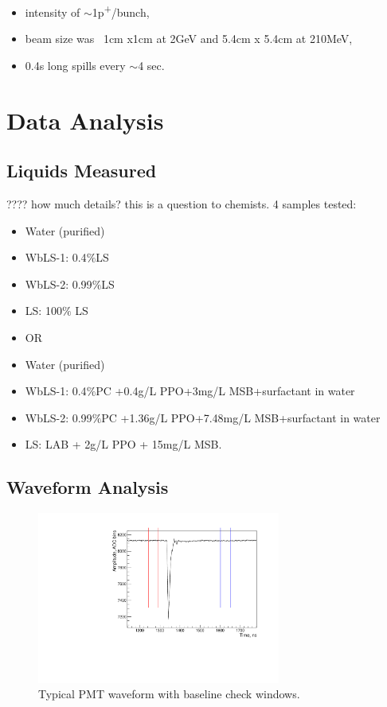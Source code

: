 \documentclass[preprint,12pt]{elsarticle}
\begin{document}
\begin{itemize}
	\item intensity of $\sim$1p\textsuperscript{+}/bunch,
	\item beam size was ~1cm x1cm at 2GeV and 5.4cm x 5.4cm at 210MeV,
	\item 0.4s long spills every $\sim$4 sec.
\end{itemize}

 \section{Data Analysis}
 \label{dataanalysissectiontop}


\subsection{Liquids Measured}
\label{liquidsmeasuredsection}
???? how much details? this is a question to chemists.
4 samples tested:
\begin{itemize}

 \item{Water (purified)}
 \item{WbLS-1: 0.4$\%$LS}
 \item{WbLS-2: 0.99$\%$LS}
 \item{LS: 100$\%$ LS}
\item{OR}

\item{Water (purified)}
 \item{WbLS-1: 0.4$\%$PC +0.4g/L PPO+3mg/L MSB+surfactant in water}
 \item{WbLS-2: 0.99$\%$PC +1.36g/L PPO+7.48mg/L MSB+surfactant in water}
 \item{LS: LAB + 2g/L PPO + 15mg/L MSB.}
\end{itemize}


\subsection{Waveform Analysis}
\label{waveformanalysis}


\begin{figure}[ht]
\centering
\includegraphics[width=80mm]{PMTtypicalSignal.pdf}
\caption{Typical PMT waveform with baseline check windows.} \label{typicalpmtsignal}
\end{figure}
\end{document}
